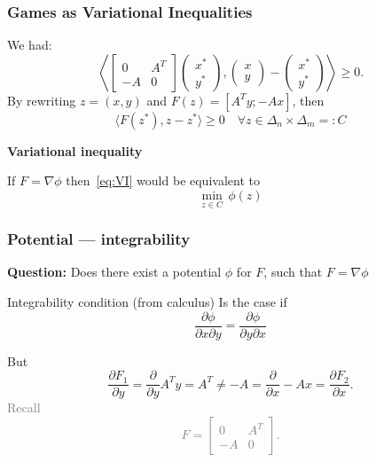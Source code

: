 \documentclass[aspectratio=149]{beamer}
\begin{document}
\begin{frame}
  \frametitle{Games as Variational Inequalities}
  We had:
  \begin{equation}
  \left\langle \begin{bmatrix}
      0 & A^T \\
      -A & 0
    \end{bmatrix}
    \left(\begin{array}{c}
      x^*\\ y^*
    \end{array}  \right),
    \left(\begin{array}{c}
      x \\ y
    \end{array}  \right)
    - %
    \left(\begin{array}{c}
      x^* \\
      y^*
    \end{array} \right)
 \right\rangle \ge 0. %
  \end{equation}
  By rewriting $z=(x,y)$ and $F(z) = [A^T y; -Ax]$, then
  \begin{equation}\tag{VI}
    \label{eq:VI}
    \langle F(z^*), z-z^* \rangle \ge 0 \quad \forall z \in \Delta_n \times \Delta_m =: C
  \end{equation}
  \begin{center}
    \textbf{Variational inequality}
  \end{center}

  \begin{block}{}
  If $F = \nabla \phi$ then~\eqref{eq:VI} would be equivalent to
  \begin{equation}
    \min_{z\in C} \, \phi(z)
  \end{equation}
  \end{block}
\end{frame}

\begin{frame}
  \frametitle{Potential --- integrability}

  \textbf{Question:} Does there exist a potential $\phi$ for $F$, such that $F = \nabla \phi$

  \begin{block}{Integrability condition (from calculus)}
    Is the case if
    \begin{equation}
      \frac{\partial \phi}{\partial x \partial y} = \frac{\partial \phi}{\partial y \partial x}
    \end{equation}
  \end{block}
  But
  \begin{equation}
    \frac{\partial F_1}{\partial y} = \frac{\partial}{\partial y} A^T y = A^T \neq - A = \frac{\partial}{\partial x} -Ax =\frac{\partial F_2}{\partial x}.
  \end{equation}
  \textcolor{gray}{Recall
    \begin{equation}
      F = \begin{bmatrix}
      0 & A^T \\
      -A & 0
    \end{bmatrix}.
    \end{equation}}
\end{frame}
\end{document}
